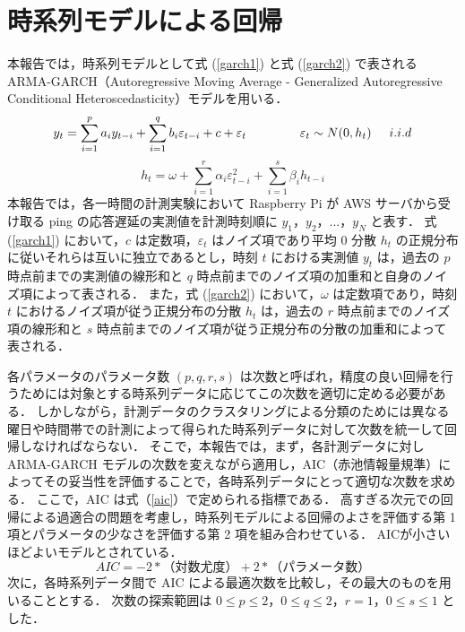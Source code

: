 \documentclass[a4j]{jarticle}
\begin{document}
\section{時系列モデルによる回帰}
本報告では，時系列モデルとして式 (\ref{garch1}) と式 (\ref{garch2}) で表される ARMA-GARCH（Autoregressive Moving Average - Generalized Autoregressive Conditional Heteroscedasticity）モデルを用いる．
\begin{equation}
y_t = \sum_{i=1}^p a_i y_{t-i} + \sum_{i=1}^q b_i \varepsilon_{t-i} + c + \varepsilon_{t} \hspace{1.5cm}\varepsilon_t \sim N(0,h_t) \hspace{0.5cm} i.i.d
\label{garch1}
\end{equation}
\begin{equation}
\displaystyle h_{t} = \omega + \sum_{i=1}^{r}\alpha_i\varepsilon_{t-i}^2 + \sum_{i=1}^{s}\beta_ih_{t-i}
\label{garch2}
\end{equation}
本報告では，各一時間の計測実験において Raspberry Pi が AWS サーバから受け取る ping の応答遅延の実測値を計測時刻順に $y_1$，$y_2$，...，$y_N$ と表す．
式 (\ref{garch1}) において，$c$ は定数項，$\varepsilon_t$ はノイズ項であり平均 0 分散 $h_t$ の正規分布に従いそれらは互いに独立であるとし，時刻 $t$ における実測値 $y_t$ は，過去の $p$ 時点前までの実測値の線形和と $q$ 時点前までのノイズ項の加重和と自身のノイズ項によって表される．
また，式 (\ref{garch2}) において，$\omega$ は定数項であり，時刻 $t$ におけるノイズ項が従う正規分布の分散 $h_t$ は，過去の $r$ 時点前までのノイズ項の線形和と $s$ 時点前までのノイズ項が従う正規分布の分散の加重和によって表される．

各パラメータのパラメータ数 $(p,q,r,s)$ は次数と呼ばれ，精度の良い回帰を行うためには対象とする時系列データに応じてこの次数を適切に定める必要がある．
しかしながら，計測データのクラスタリングによる分類のためには異なる曜日や時間帯での計測によって得られた時系列データに対して次数を統一して回帰しなければならない．
そこで，本報告では，まず，各計測データに対し ARMA-GARCH モデルの次数を変えながら適用し，AIC（赤池情報量規準）によってその妥当性を評価することで，各時系列データにとって適切な次数を求める．
ここで，AIC は式（\ref{aic}）で定められる指標である．
高すぎる次元での回帰による過適合の問題を考慮し，時系列モデルによる回帰のよさを評価する第 1 項とパラメータの少なさを評価する第 2 項を組み合わせている．
AICが小さいほどよいモデルとされている．
\begin{equation}
AIC = -2 *（対数尤度）+2 *（パラメータ数）
\label{aic}
\end{equation}
次に，各時系列データ間で AIC による最適次数を比較し，その最大のものを用いることとする．
次数の探索範囲は $0 \le p \le 2$，$0 \le q \le 2$，$r = 1$，$0 \le s \le 1$ とした．
\end{document}
